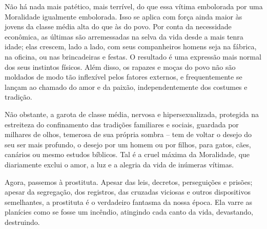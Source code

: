 Não há nada mais patético, mais terrível, do que essa vítima embolorada
por uma Moralidade igualmente embolorada. Isso se aplica com força ainda
maior às jovens da classe média alta do que às do povo. Por conta da
necessidade econômica, as últimas são arremessadas na selva da vida
desde a mais tenra idade; elas crescem, lado a lado, com seus
companheiros homens seja na fábrica, na oficina, ou nas brincadeiras e
festas. O resultado é uma expressão mais normal dos seus instintos
físicos. Além disso, os rapazes e moças do povo não são moldados de modo
tão inflexível pelos fatores externos, e frequentemente se lançam ao
chamado do amor e da paixão, independentemente dos costumes e tradição.

Não obstante, a garota de classe média, nervosa e hipersexualizada,
protegida na estreiteza do confinamento das tradições familiares e
sociais, guardada por milhares de olhos, temerosa de sua própria sombra
-- tem de voltar o desejo do seu ser mais profundo, o desejo por um
homem ou por filhos, para gatos, cães, canários ou mesmo estudos
bíblicos. Tal é a cruel máxima da Moralidade, que diariamente exclui o
amor, a luz e a alegria da vida de inúmeras vítimas.

Agora, passemos à prostituta. Apesar das leis, decretos, perseguições e
prisões; apesar da segregação, dos registros, das cruzadas viciosas e
outros dispositivos semelhantes, a prostituta é o verdadeiro fantasma da
nossa época. Ela varre as planícies como se fosse um incêndio, atingindo
cada canto da vida, devastando, destruindo.

